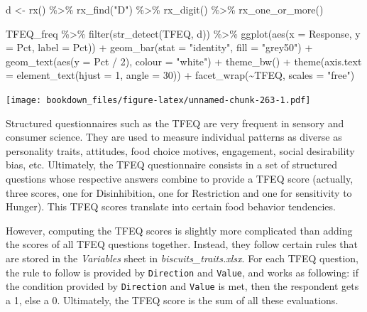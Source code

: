 \documentclass[
]{krantz}
\makeatletter
\newenvironment{Shaded}{\begin{snugshade}}{\end{snugshade}}
\newcommand{\AttributeTok}[1]{\textcolor[rgb]{0.61,0.61,0.61}{#1}}
\newcommand{\DecValTok}[1]{\textcolor[rgb]{0.06,0.06,0.06}{#1}}
\newcommand{\FunctionTok}[1]{\textcolor[rgb]{0,0,0}{#1}}
\newcommand{\NormalTok}[1]{#1}
\newcommand{\OtherTok}[1]{\textcolor[rgb]{0.37,0.37,0.37}{#1}}
\newcommand{\SpecialCharTok}[1]{\textcolor[rgb]{0,0,0}{#1}}
\newcommand{\StringTok}[1]{\textcolor[rgb]{0.5,0.5,0.5}{#1}}
\newenvironment{kframe}{%
\medskip{}
\setlength{\fboxsep}{.8em}
 \def\at@end@of@kframe{}%
 \ifinner\ifhmode%
  \def\at@end@of@kframe{\end{minipage}}%
  \begin{minipage}{\columnwidth}%
 \fi\fi%
 \def\FrameCommand##1{\hskip\@totalleftmargin \hskip-\fboxsep
 \colorbox{shadecolor}{##1}\hskip-\fboxsep
     \hskip-\linewidth \hskip-\@totalleftmargin \hskip\columnwidth}%
 \MakeFramed {\advance\hsize-\width
   \@totalleftmargin\z@ \linewidth\hsize
   \@setminipage}}%
 {\par\unskip\endMakeFramed%
 \at@end@of@kframe}
\renewenvironment{Shaded}{\begin{kframe}}{\end{kframe}}
\makeatother
\begin{document}
\begin{Shaded}
\begin{Highlighting}[]
\NormalTok{d }\OtherTok{\textless{}{-}} \FunctionTok{rx}\NormalTok{() }\SpecialCharTok{\%\textgreater{}\%}
  \FunctionTok{rx\_find}\NormalTok{(}\StringTok{"D"}\NormalTok{) }\SpecialCharTok{\%\textgreater{}\%}
  \FunctionTok{rx\_digit}\NormalTok{() }\SpecialCharTok{\%\textgreater{}\%}
  \FunctionTok{rx\_one\_or\_more}\NormalTok{()}

\NormalTok{TFEQ\_freq }\SpecialCharTok{\%\textgreater{}\%}
  \FunctionTok{filter}\NormalTok{(}\FunctionTok{str\_detect}\NormalTok{(TFEQ, d)) }\SpecialCharTok{\%\textgreater{}\%}
  \FunctionTok{ggplot}\NormalTok{(}\FunctionTok{aes}\NormalTok{(}\AttributeTok{x =}\NormalTok{ Response, }\AttributeTok{y =}\NormalTok{ Pct, }\AttributeTok{label =}\NormalTok{ Pct)) }\SpecialCharTok{+}
  \FunctionTok{geom\_bar}\NormalTok{(}\AttributeTok{stat =} \StringTok{"identity"}\NormalTok{, }\AttributeTok{fill =} \StringTok{"grey50"}\NormalTok{) }\SpecialCharTok{+}
  \FunctionTok{geom\_text}\NormalTok{(}\FunctionTok{aes}\NormalTok{(}\AttributeTok{y =}\NormalTok{ Pct }\SpecialCharTok{/} \DecValTok{2}\NormalTok{), }\AttributeTok{colour =} \StringTok{"white"}\NormalTok{) }\SpecialCharTok{+}
  \FunctionTok{theme\_bw}\NormalTok{() }\SpecialCharTok{+}
  \FunctionTok{theme}\NormalTok{(}\AttributeTok{axis.text =} \FunctionTok{element\_text}\NormalTok{(}\AttributeTok{hjust =} \DecValTok{1}\NormalTok{, }\AttributeTok{angle =} \DecValTok{30}\NormalTok{)) }\SpecialCharTok{+}
  \FunctionTok{facet\_wrap}\NormalTok{(}\SpecialCharTok{\textasciitilde{}}\NormalTok{TFEQ, }\AttributeTok{scales =} \StringTok{"free"}\NormalTok{)}
\end{Highlighting}
\end{Shaded}

\texttt{[image: bookdown\_files/figure-latex/unnamed-chunk-263-1.pdf]}

Structured questionnaires such as the TFEQ are very frequent in sensory and consumer science. They are used to measure individual patterns as diverse as personality traits, attitudes, food choice motives, engagement, social desirability bias, etc. Ultimately, the TFEQ questionnaire consists in a set of structured questions whose respective answers combine to provide a TFEQ score (actually, three scores, one for Disinhibition, one for Restriction and one for sensitivity to Hunger). This TFEQ scores translate into certain food behavior tendencies.

However, computing the TFEQ scores is slightly more complicated than adding the scores of all TFEQ questions together. Instead, they follow certain rules that are stored in the \emph{Variables} sheet in \emph{biscuits\_traits.xlsx}. For each TFEQ question, the rule to follow is provided by \texttt{Direction} and \texttt{Value}, and works as following: if the condition provided by \texttt{Direction} and \texttt{Value} is met, then the respondent gets a 1, else a 0. Ultimately, the TFEQ score is the sum of all these evaluations.
\end{document}
